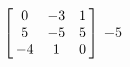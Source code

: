 {$\left[\hskip -3pt \begin{array}{ccc} 0&-3&1\\  5&-5&5
\\  -4&1&0\end{array}\hskip -3pt \right]
$} 
{$-5$}



  

